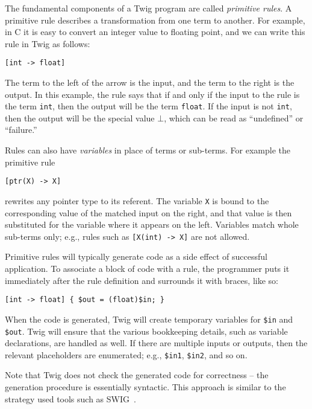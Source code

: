The fundamental components of a Twig program are called \emph{primitive rules}. A primitive rule describes a transformation from one term to another. For example, in C it is easy to convert an integer value to floating point, and we can write this rule in Twig as follows:

\begin{verbatim}
[int -> float]
\end{verbatim}

The term to the left of the arrow is the input, and the term to the right is the output. In this example, the rule says that if and only if the input to the rule is the term \texttt{int}, then the output will be the term \texttt{float}. If the input is not \texttt{int}, then the output will be the special value $\bot$, which can be read as ``undefined'' or ``failure.''

Rules can also have \emph{variables} in place of terms or sub-terms. For example the primitive rule

\begin{verbatim}
[ptr(X) -> X]
\end{verbatim}

rewrites any pointer type to its referent. The variable \texttt{X} is bound to the corresponding value of the matched input on the right, and that value is then substituted for the variable where it appears on the left. Variables match whole sub-terms only; e.g., rules such as \texttt{[X(int) -> X]} are not allowed.

Primitive rules will typically generate code as a side effect of successful application. To associate a block of code with a rule, the programmer puts it immediately after the rule definition and surrounds it with braces, like so:

\begin{verbatim}
[int -> float] { $out = (float)$in; }
\end{verbatim}

When the code is generated, Twig will create temporary variables for \texttt{\$in} and \texttt{\$out}. Twig will ensure that the various bookkeeping details, such as variable declarations, are handled as well. If there are multiple inputs or outputs, then the relevant placeholders are enumerated; e.g., \texttt{\$in1}, \texttt{\$in2}, and so on.

Note that Twig does not check the generated code for correctness  -- the generation procedure is essentially syntactic. This approach is similar to the strategy used tools such as SWIG~\cite{swig}.

